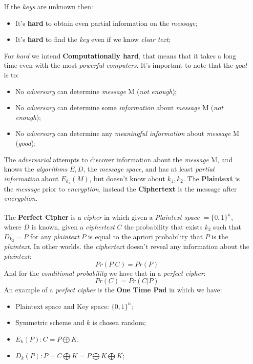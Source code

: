 \documentclass{article}
\begin{document}
If the \emph{keys} are unknown then:
\begin{itemize}
\item It's \textbf{hard} to obtain even partial information on the \emph{message};
\item It's \textbf{hard} to find the \emph{key} even if we know \emph{clear text};
\end{itemize}
For \emph{hard} we intend \textbf{Computationally hard}, that means that it takes a long time even with the most \emph{powerful computers}. It's important to note that the \emph{goal} is to:
\begin{itemize}
\item No \emph{adversary} can determine \emph{message} M (\emph{not enough});
\item No \emph{adversary} can determine some \emph{information} about \emph{message} M (\emph{not enough});
\item No \emph{adversary} can determine any \emph{meaningful information} about \emph{message} M (\emph{good});
\end{itemize}
The \emph{adversarial} attempts to discover information about the \emph{message} M, and knows the \emph{algorithms} $E,D$, the\emph{ message space}, and has at least \emph{partial information} about $E_{k_1}(M)$, but doesn't know about $k_1,k_2$. The \textbf{Plaintext} is the \emph{message} prior to \emph{encryption}, instead the \textbf{Ciphertext} is the message after \emph{encryption}. \\\\
The \textbf{Perfect Cipher} is a \emph{cipher} in which given a \emph{Plaintext space} $= \{0,1\}^n$, where $D$ is known, given a \emph{ciphertext} $C$ the probability that exists $k_2$ such that $D_{k_2} = P$ for any \emph{plaintext} $P$  is equal to the apriori probability that $P$ is the \emph{plaintext}. In other worlds. the \emph{ciphertext} doesn't reveal any information about the \emph{plaintext}:
\[Pr(P|C) = Pr(P)\]
And for the \emph{conditional probability} we have that in a \emph{perfect cipher}:
\[Pr(C)=Pr(C|P)\]
An example of a \emph{perfect cipher} is the \textbf{One Time Pad} in which we have:
\begin{itemize}
\item Plaintext space and Key space: $\{0,1\}^n$;
\item Symmetric scheme and $k$ is chosen random;
\item $E_k(P): C = P \bigoplus K$;
\item $D_k(P): P= C \bigoplus K = P \bigoplus K \bigoplus K$;
\end{itemize}
\end{document}
